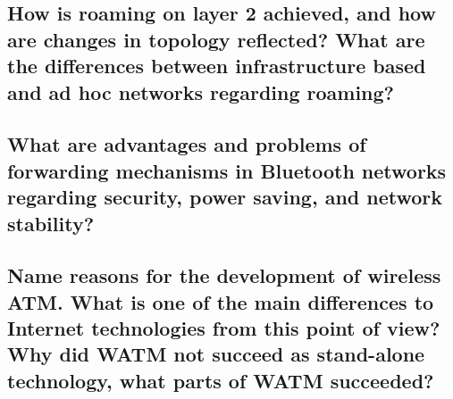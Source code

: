 \subsection{How is roaming on layer 2 achieved, and how are changes in topology reflected? What are the differences between infrastructure based and ad hoc networks regarding roaming?}

\subsection{What are advantages and problems of forwarding mechanisms in Bluetooth networks regarding security, power saving, and network stability?}

\subsection{Name reasons for the development of wireless ATM. What is one of the main differences to Internet technologies from this point of view? Why did WATM not succeed as stand-alone technology, what parts of WATM succeeded?}


